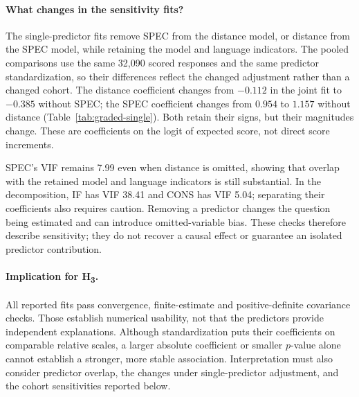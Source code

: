 \paragraph*{What changes in the sensitivity fits?} The single-predictor fits remove SPEC from the distance model, or distance from the SPEC model, while retaining the model and language indicators. The pooled comparisons use the same 32,090 scored responses and the same predictor standardization, so their differences reflect the changed adjustment rather than a changed cohort. The distance coefficient changes from $-0.112$ in the joint fit to $-0.385$ without SPEC; the SPEC coefficient changes from $0.954$ to $1.157$ without distance (Table~\ref{tab:graded-single}). Both retain their signs, but their magnitudes change. These are coefficients on the logit of expected score, not direct score increments.

SPEC's VIF remains 7.99 even when distance is omitted, showing that overlap with the retained model and language indicators is still substantial. In the decomposition, IF has VIF 38.41 and CONS has VIF 5.04; separating their coefficients also requires caution. Removing a predictor changes the question being estimated and can introduce omitted-variable bias. These checks therefore describe sensitivity; they do not recover a causal effect or guarantee an isolated predictor contribution.

\paragraph*{Implication for H\textsubscript{3}.} All reported fits pass convergence, finite-estimate and positive-definite covariance checks. Those establish numerical usability, not that the predictors provide independent explanations. Although standardization puts their coefficients on comparable relative scales, a larger absolute coefficient or smaller $p$-value alone cannot establish a stronger, more stable association. Interpretation must also consider predictor overlap, the changes under single-predictor adjustment, and the cohort sensitivities reported below.
